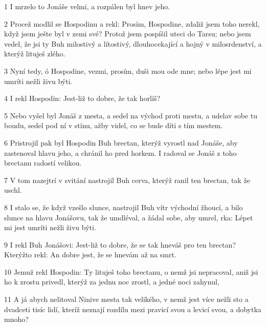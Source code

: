 \par 1 I mrzelo to Jonáše velmi, a rozpálen byl hnev jeho.
\par 2 Procež modlil se Hospodinu a rekl: Prosím, Hospodine, zdaliž jsem toho nerekl, když jsem ješte byl v zemi své? Protož jsem pospíšil uteci do Tarsu; nebo jsem vedel, že jsi ty Buh milostivý a lítostivý, dlouhocekající a hojný v milosrdenství, a kterýž lituješ zlého.
\par 3 Nyní tedy, ó Hospodine, vezmi, prosím, duši mou ode mne; nebo lépe jest mi umríti nežli živu býti.
\par 4 I rekl Hospodin: Jest-liž to dobre, že tak horlíš?
\par 5 Nebo vyšel byl Jonáš z mesta, a sedel na východ proti mestu, a udelav sobe tu boudu, sedel pod ní v stínu, ažby videl, co se bude díti s tím mestem.
\par 6 Pristrojil pak byl Hospodin Buh brectan, kterýž vyrostl nad Jonáše, aby zastenoval hlavu jeho, a chránil ho pred horkem. I radoval se Jonáš z toho brectanu radostí velikou.
\par 7 V tom nazejtrí v svitání nastrojil Buh cerva, kterýž ranil ten brectan, tak že uschl.
\par 8 I stalo se, že když vzešlo slunce, nastrojil Buh vítr východní žhoucí, a bilo slunce na hlavu Jonášovu, tak že umdléval, a žádal sobe, aby umrel, rka: Lépet mi jest umríti nežli živu býti.
\par 9 I rekl Buh Jonášovi: Jest-liž to dobre, že se tak hneváš pro ten brectan? Kterýžto rekl: An dobre jest, že se hnevám až na smrt.
\par 10 Jemuž rekl Hospodin: Ty lituješ toho brectanu, o nemž jsi nepracoval, aniž jsi ho k zrostu privedl, kterýž za jednu noc zrostl, a jedné noci zahynul,
\par 11 A já abych nelitoval Ninive mesta tak velikého, v nemž jest více nežli sto a dvadceti tisíc lidí, kteríž neznají rozdílu mezi pravicí svou a levicí svou, a dobytka mnoho?

